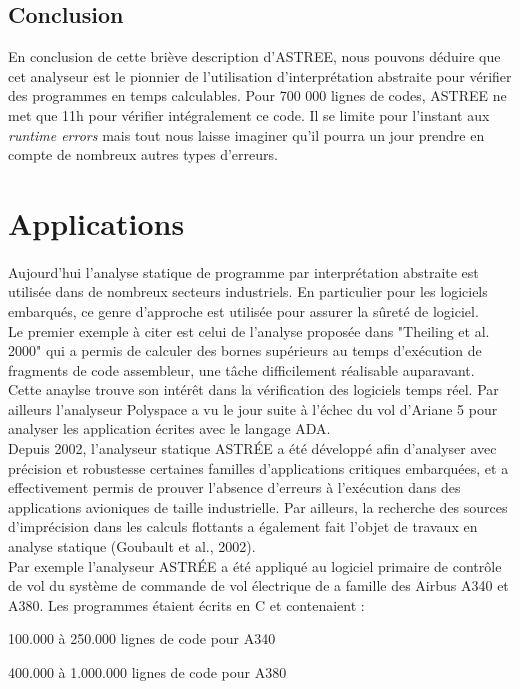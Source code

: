 \documentclass[french]{report}
\begin{document}
\subsection{Conclusion}
En conclusion de cette briève description d'ASTREE, nous pouvons déduire que cet analyseur est le pionnier de l'utilisation
d'interprétation abstraite pour vérifier des programmes en temps calculables. Pour 700 000 lignes
de codes, ASTREE ne met que 11h pour vérifier intégralement ce code.
Il se limite pour l'instant aux \textit{runtime errors} mais tout nous laisse imaginer qu'il
pourra un jour prendre en compte de nombreux autres types d'erreurs.


\section{Applications}

\paragraph{}
Aujourd'hui l'analyse statique de programme par interprétation abstraite est utilisée dans de nombreux secteurs industriels. En particulier pour les logiciels embarqués, ce genre d'approche est utilisée pour assurer la sûreté de logiciel. \\

Le premier exemple à citer est celui de l'analyse proposée dans "Theiling et al. 2000" qui a permis de calculer des bornes supérieurs au temps d'exécution de fragments de code assembleur, une tâche difficilement réalisable auparavant. Cette anaylse trouve son intérêt dans la vérification des logiciels temps réel. Par ailleurs l'analyseur Polyspace a vu le jour suite à l'échec du vol d'Ariane 5 pour analyser les application écrites avec le langage ADA. \\

Depuis 2002, l’analyseur statique ASTRÉE a été développé afin d’analyser avec précision et robustesse certaines familles d’applications critiques embarquées, et a effectivement
permis de prouver l’absence d’erreurs à l’exécution dans des applications avioniques
de taille industrielle. Par ailleurs, la recherche des sources d’imprécision dans les calculs flottants a également fait l’objet de travaux en analyse statique (Goubault et al., 2002). \\

Par exemple l'analyseur ASTRÉE a été appliqué au logiciel primaire de contrôle de vol du système de commande de vol électrique de a famille des Airbus A340 et A380. Les programmes étaient écrits en C et contenaient : \\
\begin{description}
	\item 100.000 à 250.000 lignes de code pour A340
    \item 400.000 à 1.000.000 lignes de code pour A380 \\
\end{description}
\end{document}
